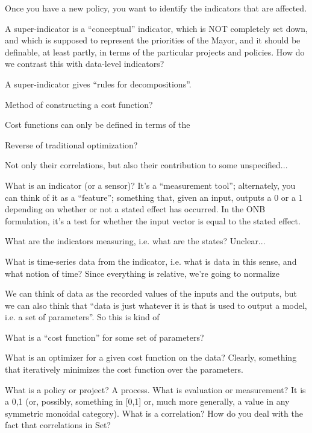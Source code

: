 \documentclass{sig-alternate-05-2015}
\theoremstyle{plain}
\theoremstyle{plain}
\theoremstyle{remark}
\begin{document}
Once you have a new policy, you want to identify the indicators that are affected.

A super-indicator is a ``conceptual'' indicator, which is NOT completely set down, and which is supposed to represent the priorities of the Mayor, and it should be definable, at least partly, in terms of the particular projects and policies. How do we contrast this with data-level indicators?

A super-indicator gives ``rules for decompositions''.

Method of constructing a cost function?





Cost functions can only be defined in terms of the 

Reverse of traditional optimization?

Not only their correlations, but also their contribution to some unspecified... 

What is an indicator (or a sensor)? It's a ``measurement tool''; alternately, you can think of it as a ``feature''; something that, given an input, outputs a 0 or a 1 depending on whether or not a stated effect has occurred. In the ONB formulation, it's a test for whether the input vector is equal to the stated effect.

What are the indicators measuring, i.e. what are the states? Unclear... 

What is time-series data from the indicator, i.e. what is data in this sense, and what notion of time? Since everything is relative, we're going to normalize 

We can think of data as the recorded values of the inputs and the outputs, but we can also think that ``data is just whatever it is that is used to output a model, i.e. a set of parameters''. So this is kind of

What is a ``cost function'' for some set of parameters?

What is an optimizer for a given cost function on the data? Clearly, something that iteratively minimizes the cost function over the parameters.





What is a policy or project? A process. What is evaluation or measurement? It is a 0,1 (or, possibly, something in [0,1] or, much more generally, a value in any symmetric monoidal category). What is a correlation? How do you deal with the fact that correlations in Set? 
\end{document}
